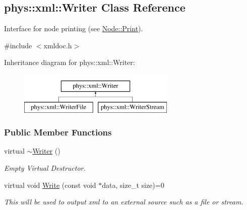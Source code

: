 \hypertarget{classphys_1_1xml_1_1Writer}{
\subsection{phys::xml::Writer Class Reference}
\label{d2/d28/classphys_1_1xml_1_1Writer}
}


Interface for node printing (see \hyperlink{classphys_1_1xml_1_1Node_adbe10968a804a94552e1dc8223744406}{Node::Print}).  




{\ttfamily \#include $<$xmldoc.h$>$}

Inheritance diagram for phys::xml::Writer:\begin{figure}[H]
\begin{center}
\leavevmode
\includegraphics[height=2.000000cm]{d2/d28/classphys_1_1xml_1_1Writer}
\end{center}
\end{figure}
\subsubsection*{Public Member Functions}
\begin{DoxyCompactItemize}
\item 
\hypertarget{classphys_1_1xml_1_1Writer_a527c2e01738b1e570d08674eada21800}{
virtual \hyperlink{classphys_1_1xml_1_1Writer_a527c2e01738b1e570d08674eada21800}{$\sim$Writer} ()}
\label{d2/d28/classphys_1_1xml_1_1Writer_a527c2e01738b1e570d08674eada21800}

\begin{DoxyCompactList}\small\item\em Empty Virtual Destructor. \item\end{DoxyCompactList}\item 
virtual void \hyperlink{classphys_1_1xml_1_1Writer_ab6d4758ab53743f236eb64d5b2dd7e9e}{Write} (const void $\ast$data, size\_\-t size)=0
\begin{DoxyCompactList}\small\item\em This will be used to output xml to an external source such as a file or stream. \item\end{DoxyCompactList}\end{DoxyCompactItemize}


